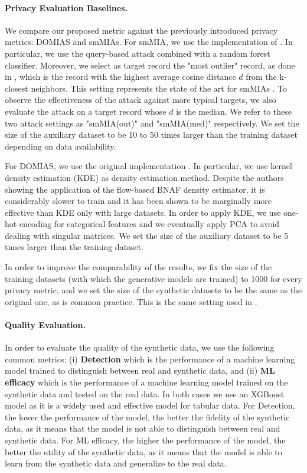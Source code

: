 \paragraph{Privacy Evaluation Baselines.}
We compare our proposed metric against the previously introduced privacy metrics: DOMIAS and smMIAs.
For smMIA, we use the implementation of \citep{meeus2023achilles}. In particular, we use the query-based attack \citep{houssiau2022tapas} combined with a random forest classifier.
Moreover, we select as target record the "most outlier" record, as done in \citep{meeus2023achilles}, which is the record with the highest average cosine distance $d$ from the k-closest neighbors. This setting represents the state of the art for smMIAs \citep{meeus2023achilles}.
To observe the effectiveness of the attack against more typical targets, we also evaluate the attack on a target record whose $d$ is the median. We refer to these two attack settings as "smMIA(out)" and "smMIA(med)" respectively.
We set the size of the auxiliary dataset to be 10 to 50 times larger than the training dataset depending on data availability.

For DOMIAS, we use the original implementation \citep{van2023membership}. In particular, we use kernel density estimation (KDE) as density estimation method. Despite the authors showing the application of the flow-based BNAF \citep{de2020block} density estimator, it is considerably slower to train and it has been shown to be marginally more effective than KDE only with large datasets.
In order to apply KDE, we use one-hot encoding for categorical features and we eventually apply PCA to avoid dealing with singular matrices. We set the size of the auxiliary dataset to be 5 times larger than the training dataset.

In order to improve the comparability of the results, we fix the size of the training datasets (with which the generative models are trained) to 1000 for every privacy metric, and we set the size of the synthetic datasets to be the same as the original one, as is common practice. This is the same setting used in \citet{meeus2023achilles}.

\paragraph{Quality Evaluation.}
In order to evaluate the quality of the synthetic data, we use the following common metrics: (i) \textbf{Detection} which is the performance of a machine learning model trained to distinguish between real and synthetic data, and (ii) \textbf{ML efficacy} which is the performance of a machine learning model trained on the synthetic data and tested on the real data. In both cases we use an XGBoost model \citep{chen2015xgboost} as it is a widely used and effective model for tabular data.
For Detection, the lower the performance of the model, the better the fidelity of the synthetic data, as it means that the model is not able to distinguish between real and synthetic data. For ML efficacy, the higher the performance of the model, the better the utility of the synthetic data, as it means that the model is able to learn from the synthetic data and generalize to the real data.


